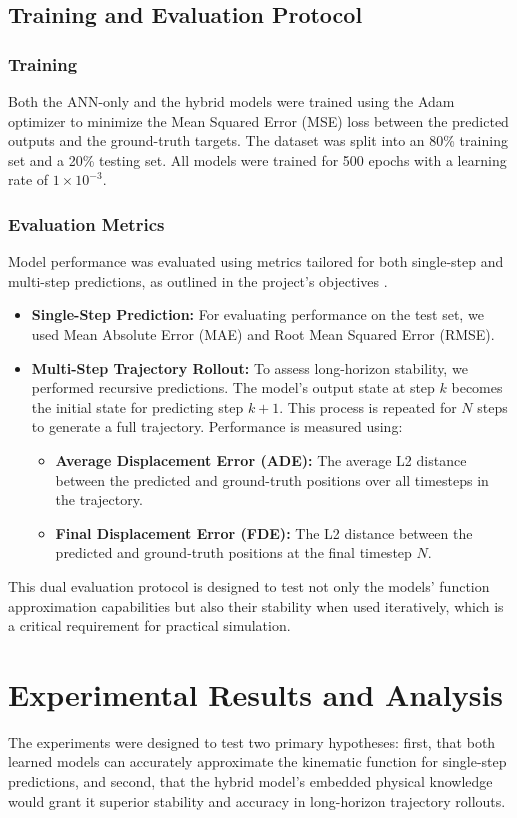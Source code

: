 \documentclass[conference]{IEEEtran}
\begin{document}
\subsection{Training and Evaluation Protocol}
\subsubsection{Training}
Both the ANN-only and the hybrid models were trained using the Adam optimizer to minimize the Mean Squared Error (MSE) loss between the predicted outputs and the ground-truth targets. The dataset was split into an 80\% training set and a 20\% testing set. All models were trained for 500 epochs with a learning rate of $1 \times 10^{-3}$.

\subsubsection{Evaluation Metrics}
Model performance was evaluated using metrics tailored for both single-step and multi-step predictions, as outlined in the project's objectives \cite{b3}.
\begin{itemize}
    \item \textbf{Single-Step Prediction:} For evaluating performance on the test set, we used Mean Absolute Error (MAE) and Root Mean Squared Error (RMSE).
    \item \textbf{Multi-Step Trajectory Rollout:} To assess long-horizon stability, we performed recursive predictions. The model's output state at step $k$ becomes the initial state for predicting step $k+1$. This process is repeated for $N$ steps to generate a full trajectory. Performance is measured using:
        \begin{itemize}
            \item \textbf{Average Displacement Error (ADE):} The average L2 distance between the predicted and ground-truth positions over all timesteps in the trajectory.
            \item \textbf{Final Displacement Error (FDE):} The L2 distance between the predicted and ground-truth positions at the final timestep $N$.
        \end{itemize}
\end{itemize}
This dual evaluation protocol is designed to test not only the models' function approximation capabilities but also their stability when used iteratively, which is a critical requirement for practical simulation.

\section{Experimental Results and Analysis}
The experiments were designed to test two primary hypotheses: first, that both learned models can accurately approximate the kinematic function for single-step predictions, and second, that the hybrid model's embedded physical knowledge would grant it superior stability and accuracy in long-horizon trajectory rollouts.
\end{document}
